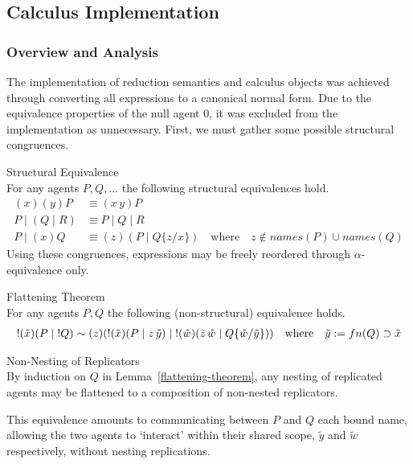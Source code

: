 \subsection{Calculus Implementation}\label{ssec:calculus-implementation}
    
    \subsubsection{Overview and Analysis}\label{sssec:calculus-analysis}
        The implementation of reduction semantics and calculus objects was achieved through converting all expressions to a canonical normal form.
        Due to the equivalence properties of the null agent $0$, it was excluded from the implementation as unnecessary.
        First, we must gather some possible structural congruences.

        \begin{lemma}{Structural Equivalence\\}
            For any agents $P, Q, \ldots$ the following structural equivalences hold.
            \begin{align*}
                (x)(y) P                & \equiv (x \, y) P \\
                P \; | \; (Q \; | \; R) & \equiv P \; | \; Q \; | \; R \\
                P \; | \; (x) Q         & \equiv (z)(P \; | \; Q\{z / x\}) \quad \text{where} \quad z \notin names(P) \cup names(Q)
            \end{align*}
            Using these congruences, expressions may be freely reordered through $\alpha$-equivalence only.
        \end{lemma}

        \begin{lemma}{Flattening Theorem\\}\label{flattening-theorem}
            For any agents $P, Q$ the following (non-structural) equivalence holds.
            \begin{align*}
                !(\tilde{x})(P \; | \; !Q) \sim (z)(!(\tilde{x})(P \; | \; z \, \tilde{y}) \; | \; !(\tilde{w})(\bar{z} \, \tilde{w} \; | \; Q\{\tilde{w}/\tilde{y}\})) \quad \text{where} \quad \tilde{y} := fn(Q) \supset \tilde{x}
            \end{align*}
        \end{lemma}
        \begin{corollary*}{Non-Nesting of Replicators\\}
            By induction on $Q$ in Lemma~\ref{flattening-theorem}, any nesting of replicated agents may be flattened to a composition of non-nested replicators.
        \end{corollary*}
        This equivalence amounts to communicating between $P$ and $Q$ each bound name, allowing the two agents to `interact' within their shared scope, $\tilde{y}$ and $\tilde{w}$ respectively, without nesting replications.

